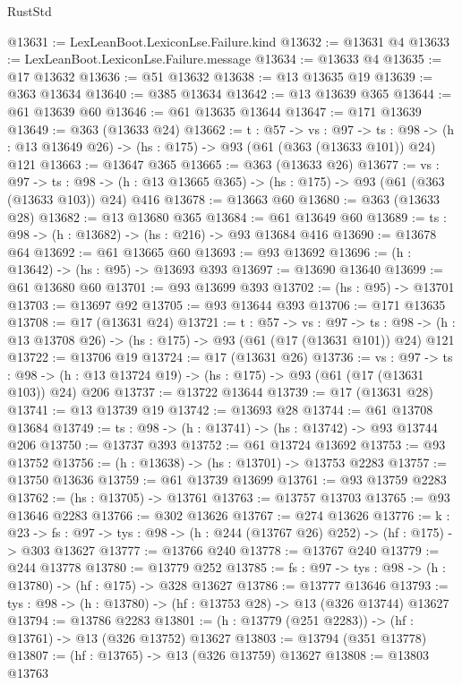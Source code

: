\begin{lexlean}{RustStd}
\begin{coremodule}
@13631 := LexLeanBoot.LexiconLse.Failure.kind
@13632 := @13631 @4
@13633 := LexLeanBoot.LexiconLse.Failure.message
@13634 := @13633 @4
@13635 := @17 @13632
@13636 := @51 @13632
@13638 := @13 @13635 @19
@13639 := @363 @13634
@13640 := @385 @13634
@13642 := @13 @13639 @365
@13644 := @61 @13639 @60
@13646 := @61 @13635 @13644
@13647 := @171 @13639
@13649 := @363 (@13633 @24)
@13662 := {t : @57} ->
  {vs : @97} ->
  {ts : @98} -> (h : @13 @13649 @26) -> (hs : @175) -> @93 (@61 (@363 (@13633 @101)) @24) @121
@13663 := @13647 @365
@13665 := @363 (@13633 @26)
@13677 := {vs : @97} ->
  {ts : @98} -> (h : @13 @13665 @365) -> (hs : @175) -> @93 (@61 (@363 (@13633 @103)) @24) @416
@13678 := @13663 @60
@13680 := @363 (@13633 @28)
@13682 := @13 @13680 @365
@13684 := @61 @13649 @60
@13689 := {ts : @98} -> (h : @13682) -> (hs : @216) -> @93 @13684 @416
@13690 := @13678 @64
@13692 := @61 @13665 @60
@13693 := @93 @13692
@13696 := (h : @13642) -> (hs : @95) -> @13693 @393
@13697 := @13690 @13640
@13699 := @61 @13680 @60
@13701 := @93 @13699 @393
@13702 := (hs : @95) -> @13701
@13703 := @13697 @92
@13705 := @93 @13644 @393
@13706 := @171 @13635
@13708 := @17 (@13631 @24)
@13721 := {t : @57} ->
  {vs : @97} ->
  {ts : @98} -> (h : @13 @13708 @26) -> (hs : @175) -> @93 (@61 (@17 (@13631 @101)) @24) @121
@13722 := @13706 @19
@13724 := @17 (@13631 @26)
@13736 := {vs : @97} ->
  {ts : @98} -> (h : @13 @13724 @19) -> (hs : @175) -> @93 (@61 (@17 (@13631 @103)) @24) @206
@13737 := @13722 @13644
@13739 := @17 (@13631 @28)
@13741 := @13 @13739 @19
@13742 := @13693 @28
@13744 := @61 @13708 @13684
@13749 := {ts : @98} -> (h : @13741) -> (hs : @13742) -> @93 @13744 @206
@13750 := @13737 @393
@13752 := @61 @13724 @13692
@13753 := @93 @13752
@13756 := (h : @13638) -> (hs : @13701) -> @13753 @2283
@13757 := @13750 @13636
@13759 := @61 @13739 @13699
@13761 := @93 @13759 @2283
@13762 := (hs : @13705) -> @13761
@13763 := @13757 @13703
@13765 := @93 @13646 @2283
@13766 := @302 @13626
@13767 := @274 @13626
@13776 := {k : @23} ->
  {fs : @97} -> {tys : @98} -> (h : @244 (@13767 @26) @252) -> (hf : @175) -> @303 @13627
@13777 := @13766 @240
@13778 := @13767 @240
@13779 := @244 @13778
@13780 := @13779 @252
@13785 := {fs : @97} -> {tys : @98} -> (h : @13780) -> (hf : @175) -> @328 @13627
@13786 := @13777 @13646
@13793 := {tys : @98} -> (h : @13780) -> (hf : @13753 @28) -> @13 (@326 @13744) @13627
@13794 := @13786 @2283
@13801 := (h : @13779 (@251 @2283)) -> (hf : @13761) -> @13 (@326 @13752) @13627
@13803 := @13794 (@351 @13778)
@13807 := (hf : @13765) -> @13 (@326 @13759) @13627
@13808 := @13803 @13763

\end{coremodule}
\end{lexlean}
